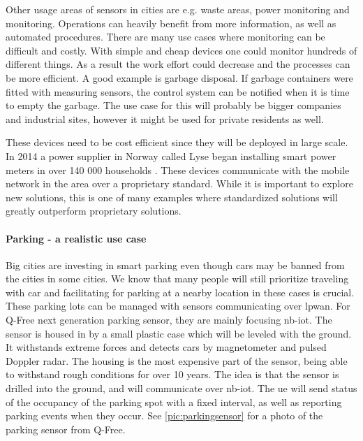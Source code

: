 \documentclass[USenglish]{ifimaster}  %
\begin{document}
Other usage areas of sensors in cities are e.g. waste areas, power monitoring and  monitoring. Operations can heavily benefit from more information, as well as automated procedures. There are many use cases where monitoring can be difficult and costly. With simple and cheap devices one could monitor hundreds of different things. As a result the work effort could decrease and the processes can be more efficient. A good example is garbage disposal. If garbage containers were fitted with measuring sensors, the control system can be notified when it is time to empty the garbage. The use case for this will probably be bigger companies and industrial sites, however it might be used for private residents as well.

These devices need to be cost efficient since they will be deployed in large scale. In 2014 a power supplier in Norway called Lyse began installing smart power meters in over 140 000 households \cite{online:lyseAMS}. These devices communicate with the mobile network in the area over a proprietary standard. While it is important to explore new solutions, this is one of many examples where standardized solutions will greatly outperform proprietary solutions.

\paragraph{Parking - a realistic use case} \label{paragraph:sensoroutline}
Big cities are investing in smart parking even though cars may be banned from the cities in some cities. We know that many people will still prioritize traveling with car and facilitating for parking at a nearby location in these cases is crucial. These parking lots can be managed with sensors communicating over \acrshort{lpwan}. For Q-Free next generation parking sensor, they are mainly focusing \acrshort{nb-iot}. The sensor is housed in by a small plastic case which will be leveled with the ground. It withstands extreme forces and detects cars by magnetometer and pulsed Doppler radar. The housing is the most expensive part of the sensor, being able to withstand rough conditions for over 10 years. The idea is that the sensor is drilled into the ground, and will communicate over \acrshort{nb-iot}. The \acrshort{ue} will send status of the occupancy of the parking spot with a fixed interval, as well as reporting parking events when they occur. See \ref{pic:parkingsensor} for a photo of the parking sensor from Q-Free.
\end{document}
